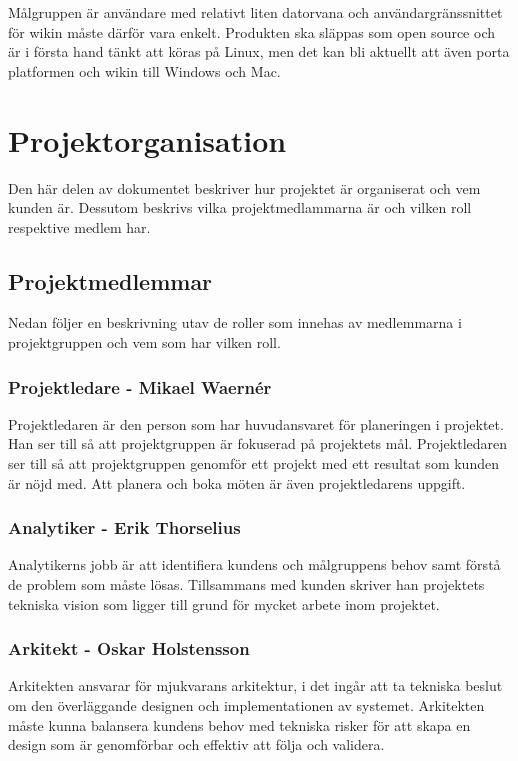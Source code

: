 Målgruppen är användare med relativt liten datorvana och användargränssnittet för wikin måste därför vara enkelt. Produkten ska släppas som open source och är i första hand tänkt att köras på Linux, men det kan bli aktuellt att även porta platformen och wikin till Windows och Mac.

\section{Projektorganisation}
Den här delen av dokumentet beskriver hur projektet är organiserat och vem kunden är. Dessutom beskrivs vilka projektmedlammarna är och vilken roll respektive medlem har.

\subsection{Projektmedlemmar}
Nedan följer en beskrivning utav de roller som innehas av medlemmarna i projektgruppen och vem som har vilken roll.

\subsubsection*{Projektledare - Mikael Waernér}
Projektledaren är den person som har huvudansvaret för planeringen i projektet. Han ser till så att projektgruppen är fokuserad på projektets mål. Projektledaren ser till så att projektgruppen genomför ett projekt med ett resultat som kunden är nöjd med. Att planera och boka möten är även projektledarens uppgift.

\subsubsection*{Analytiker - Erik Thorselius}
Analytikerns jobb är att identifiera kundens och målgruppens behov samt förstå de problem som måste lösas. Tillsammans med kunden skriver han projektets tekniska vision som ligger till grund för mycket arbete inom projektet.

\subsubsection*{Arkitekt - Oskar Holstensson}
Arkitekten ansvarar för mjukvarans arkitektur, i det ingår att ta tekniska beslut om den överläggande designen och implementationen av systemet. Arkitekten måste kunna balansera kundens behov med tekniska risker för att skapa en design som är genomförbar och effektiv att följa och validera.

